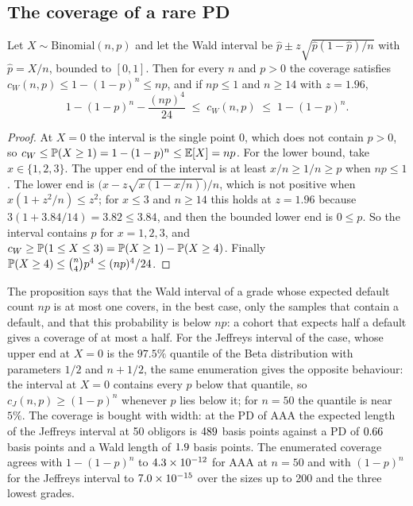 \subsection{The coverage of a rare PD}
\label{sec:theory-coverage}

\begin{proposition}\label{prop:wald}
Let $X\sim\mathrm{Binomial}(n,p)$ and let the Wald interval be $\hat p\pm z\sqrt{\hat p(1-\hat p)/n}$ with $\hat p=X/n$, bounded to $[0,1]$. Then for every $n$ and $p>0$ the coverage satisfies $c_W(n,p)\le 1-(1-p)^n\le np$, and if $np\le1$ and $n\ge14$ with $z=1.96$,
\begin{equation}
1-(1-p)^n-\frac{(np)^4}{24}\;\le\;c_W(n,p)\;\le\;1-(1-p)^n.
\label{eq:wald-coverage}
\end{equation}
\end{proposition}

\begin{proof}
At $X=0$ the interval is the single point $0$, which does not contain $p>0$, so $c_W\le\mathbb{P}(X\ge1)=1-(1-p)^n\le\mathbb E[X]=np$. For the lower bound, take $x\in\{1,2,3\}$. The upper end of the interval is at least $x/n\ge1/n\ge p$ when $np\le1$. The lower end is $\bigl(x-z\sqrt{x(1-x/n)}\bigr)/n$, which is not positive when $x(1+z^{2}/n)\le z^{2}$; for $x\le3$ and $n\ge14$ this holds at $z=1.96$ because $3(1+3.84/14)=3.82\le3.84$, and then the bounded lower end is $0\le p$. So the interval contains $p$ for $x=1,2,3$, and $c_W\ge\mathbb{P}(1\le X\le3)=\mathbb{P}(X\ge1)-\mathbb{P}(X\ge4)$. Finally $\mathbb{P}(X\ge4)\le\binom n4p^4\le(np)^4/24$.
\end{proof}

The proposition says that the Wald interval of a grade whose expected default count $np$ is at most one covers, in the best case, only the samples that contain a default, and that this probability is below $np$: a cohort that expects half a default gives a coverage of at most a half. For the Jeffreys interval of the case, whose upper end at $X=0$ is the $97.5\%$ quantile of the Beta distribution with parameters $1/2$ and $n+1/2$, the same enumeration gives the opposite behaviour: the interval at $X=0$ contains every $p$ below that quantile, so $c_J(n,p)\ge(1-p)^n$ whenever $p$ lies below it; for $n=50$ the quantile is near $5\%$. The coverage is bought with width: at the PD of AAA the expected length of the Jeffreys interval at 50 obligors is $489$ basis points against a PD of $0.66$ basis points and a Wald length of $1.9$ basis points. The enumerated coverage agrees with $1-(1-p)^n$ to $4.3\times10^{-12}$ for AAA at $n=50$ and with $(1-p)^n$ for the Jeffreys interval to $7.0\times10^{-15}$ over the sizes up to 200 and the three lowest grades.

